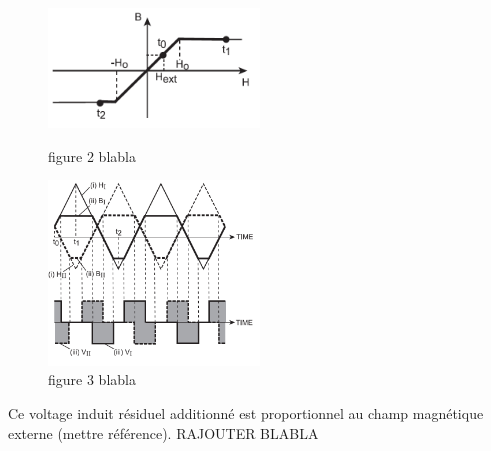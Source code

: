 \documentclass{standalone}
\begin{document}
\begin{figure}[H]
\begin{center}
\includegraphics[width=0.50\textwidth]{hysteresis2}
\caption{figure 2 blabla}

\includegraphics[width=0.50\textwidth]{voltage2}
\caption{figure 3 blabla}
\end{center}
\end{figure} 

Ce voltage induit résiduel additionné est proportionnel au champ magnétique externe (mettre référence). RAJOUTER BLABLA
\end{document}
